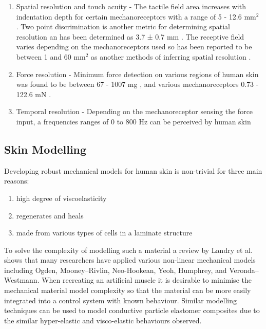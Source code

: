 \begin{enumerate}
    \item Spatial resolution and touch acuity - The tactile field area increases with indentation depth for certain mechanoreceptors with a range of 5 - 12.6 mm$^2$ \cite{Deflorio2022}. Two point discrimination is another metric for determining spatial resolution an has been determined as 3.7 ± 0.7 mm \cite{Yokota2020}. The receptive field varies depending on the mechanoreceptors used so has been reported to be between 1 and 60 mm$^2$ as another methods of inferring spatial resolution \cite{Roudaut2012}.
    \item Force resolution - Minimum force detection on various regions of human skin was found to be between 67 - 1007 mg \cite{Ackerley2014}, and various mechanoreceptors 0.73 - 122.6 mN \cite{Strzalkowski2015}.
    \item Temporal resolution - Depending on the mechanoreceptor sensing the force input, a frequencies ranges of 0 to 800 Hz can be perceived by human skin \cite{Deflorio2022}
\end{enumerate}


\subsection{Skin Modelling}
Developing robust mechanical models for human skin is non-trivial for three main reasons:
\begin{enumerate}
    \item high degree of viscoelasticity
    \item regenerates and heals
    \item made from various types of cells in a laminate structure 
\end{enumerate}
To solve the complexity of modelling such a material a review by Landry et al.\cite{Landry2021} shows that many researchers have applied various non-linear mechanical models including Ogden, Mooney–Rivlin, Neo-Hookean, Yeoh, Humphrey, and Veronda–Westmann. When recreating an artificial muscle it is desirable to minimise the mechanical material model complexity so that the material can be more easily integrated into a control system with known behaviour. Similar modelling techniques can be used to model conductive particle elastomer composites due to the similar hyper-elastic and visco-elastic behaviours observed.




